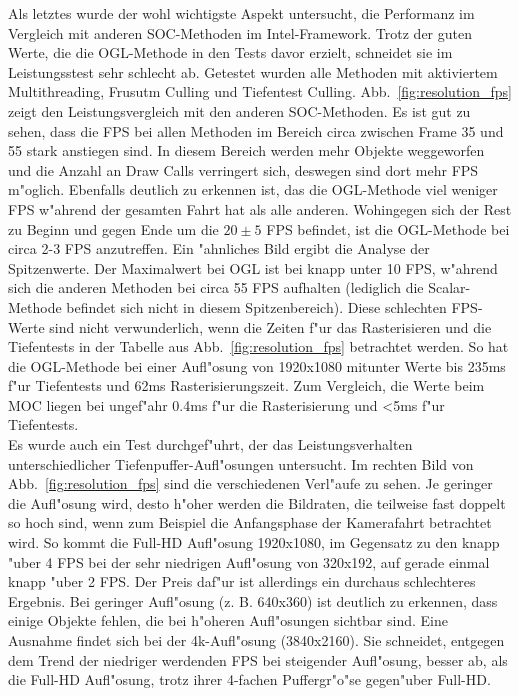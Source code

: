 \documentclass[journal]{vgtc}
\begin{document}
Als letztes wurde der wohl wichtigste Aspekt untersucht, die Performanz im Vergleich mit anderen SOC-Methoden im Intel-Framework. Trotz der guten Werte, die die OGL-Methode in den Tests  davor erzielt, schneidet sie im Leistungsstest sehr schlecht ab. Getestet wurden alle Methoden mit aktiviertem Multithreading, Frusutm Culling und Tiefentest Culling. Abb.\ \ref{fig:resolution_fps} zeigt den Leistungsvergleich mit den anderen SOC-Methoden. Es ist gut zu sehen, dass die FPS bei allen Methoden im Bereich circa zwischen Frame 35 und 55 stark anstiegen sind. In diesem Bereich werden mehr Objekte weggeworfen und die Anzahl an Draw Calls verringert sich, deswegen sind dort mehr FPS m"oglich. Ebenfalls deutlich zu erkennen ist, das die OGL-Methode viel weniger FPS w"ahrend der gesamten Fahrt hat als alle anderen. Wohingegen sich der Rest zu Beginn und gegen Ende um die $20\pm5$ FPS befindet, ist die OGL-Methode bei circa 2-3 FPS anzutreffen. Ein "ahnliches Bild ergibt die Analyse der Spitzenwerte. Der Maximalwert bei OGL ist bei knapp unter 10 FPS, w"ahrend sich die anderen Methoden bei circa 55 FPS aufhalten (lediglich die Scalar-Methode befindet sich nicht in diesem Spitzenbereich). Diese schlechten FPS-Werte sind nicht verwunderlich, wenn die Zeiten f"ur das Rasterisieren und die Tiefentests in der Tabelle aus Abb.\ \ref{fig:resolution_fps} betrachtet werden. So hat die OGL-Methode bei einer Aufl"osung von 1920x1080 mitunter Werte bis 235ms f"ur Tiefentests und 62ms Rasterisierungszeit. Zum Vergleich, die Werte beim MOC liegen bei ungef"ahr 0.4ms f"ur die Rasterisierung und <5ms f"ur Tiefentests.\\

Es wurde auch ein Test durchgef"uhrt, der das Leistungsverhalten unterschiedlicher Tiefenpuffer-Aufl"osungen untersucht. Im rechten Bild von Abb.\ \ref{fig:resolution_fps} sind die verschiedenen Verl"aufe zu sehen. Je geringer die Aufl"osung wird, desto h"oher werden die Bildraten, die teilweise fast doppelt so hoch sind, wenn zum Beispiel die Anfangsphase der Kamerafahrt betrachtet wird. So kommt die Full-HD Aufl"osung 1920x1080, im Gegensatz zu den knapp "uber 4 FPS bei der sehr niedrigen Aufl"osung von 320x192, auf gerade einmal knapp "uber 2 FPS. Der Preis daf"ur ist allerdings ein durchaus schlechteres Ergebnis. Bei geringer Aufl"osung (z. B. 640x360) ist deutlich zu erkennen, dass einige Objekte fehlen, die bei h"oheren Aufl"osungen sichtbar sind. Eine Ausnahme findet sich bei der 4k-Aufl"osung (3840x2160). Sie schneidet, entgegen dem Trend der niedriger werdenden FPS bei steigender Aufl"osung, besser ab, als die Full-HD Aufl"osung, trotz ihrer 4-fachen Puffergr"o"se gegen"uber Full-HD.\\
\end{document}
